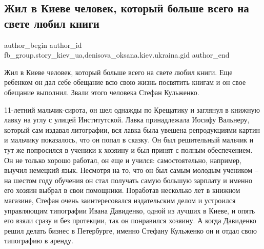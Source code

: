  
 
 
 
 
 
\subsection{Жил в Киеве человек, который больше всего на свете любил книги}
\label{sec:01_02_2022.fb.fb_group.story_kiev_ua.1.chelovek_kiev_knigi}
 
\ifcmt
 author_begin
   author_id fb_group.story_kiev_ua,denisova_oksana.kiev.ukraina.gid
 author_end
\fi

Жил в Киеве человек, который больше всего на свете любил книги. Еще ребенком он
дал себе обещание всю свою жизнь посвятить книгам и он свое обещание выполнил.
Звали этого человека Стефан Кульженко.

11-летний мальчик-сирота, он шел однажды по Крещатику и заглянул в книжную
лавку на углу с улицей Институтской. Лавка принадлежала Иосифу Вальнеру,
который сам издавал литографии, вся лавка была увешена репродукциями картин и
мальчику показалось, что он попал в сказку. Он был решительный мальчик и тут же
попросился в ученики к хозяину и был принят с полным обеспечением. Он не только
хорошо работал, он еще и учился: самостоятельно, например, выучил немецкий
язык. Несмотря на то, что он был самым молодым учеником – на шестом году
обучения он стал получать самую большую зарплату и именно его хозяин выбрал в
свои помощники. Поработав несколько лет в книжном магазине, Стефан очень
заинтересовался издательским делом и устроился управляющим типографии Ивана
Давиденко, одной из лучших в Киеве, и опять его взяли сразу и без протекции,
так он понравился хозяину. А когда Давиденко решил делать бизнес в Петербурге,
именно Стефану Кульженко он и отдал свою типографию в аренду.

\raggedcolumns
\begin{multicols}{2} %
\setlength{\parindent}{0pt}



\end{multicols} %

